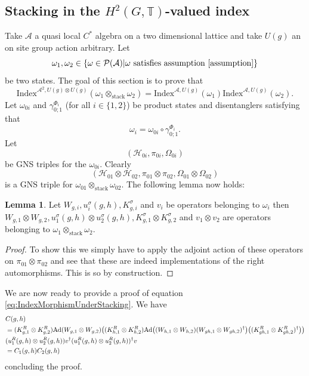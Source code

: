 \documentclass[12pt,a4paper,twoside]{article}
\let\originalleft\left
\let\originalright\right
\renewcommand{\left}{\mathopen{}\mathclose\bgroup\originalleft}
\renewcommand{\right}{\aftergroup\egroup\originalright}
\newcommand{\PP}{\mathcal P}
\newcommand{\HH}{\mathcal H}
\newcommand{\TT}{\mathbb T}
\renewcommand{\AA}{\mathcal A}
\newcommand{\Ad}[1]{\textrm{Ad}\left(#1\right)}
\theoremstyle{definition}
\newtheorem{lemma}[theorem]{Lemma}
\numberwithin{equation}{section}
\begin{document}
\subsection{Stacking in the $H^2(G,\TT)$-valued index}\label{sec:StackingOneTranslation}
Take $\AA$ a quasi local $C^*$ algebra on a two dimensional lattice and take $U(g)$ an on site group action arbitrary. Let
\begin{equation}
	\omega_1,\omega_2\in\{\omega\in\PP(\AA)|\omega\text{ satisfies assumption \ref{assumption}}\}
\end{equation}
be two states. The goal of this section is to prove that
\begin{equation}\label{eq:IndexMorphismUnderStacking}
	\textrm{Index}^{\AA^2,U(g)\otimes U(g)}(\omega_1\otimes_{\text{stack}}\omega_2)=\textrm{Index}^{\AA,U(g)}(\omega_1)\textrm{Index}^{\AA,U(g)}(\omega_2).
\end{equation}
Let $\omega_{0i}$ and $\gamma_{0;1}^{\Phi_i}$ (for all $i\in\{1,2\}$) be product states and disentanglers satisfying that
\begin{equation}
	\omega_i=\omega_{0i}\circ\gamma_{0;1}^{\Phi_i}.
\end{equation}
Let
\begin{equation}
	(\HH_{0i},\pi_{0i},\Omega_{0i})
\end{equation}
be GNS triples for the $\omega_{0i}$. Clearly
\begin{equation}
	(\HH_{01}\otimes\HH_{02},\pi_{01}\otimes\pi_{02},\Omega_{01}\otimes\Omega_{02})
\end{equation}
is a GNS triple for $\omega_{01}\otimes_{\text{stack}}\omega_{02}$. The following lemma now holds:
\begin{lemma}
	Let $W_{g,i},u^\sigma_i(g,h),K_{g,i}^\sigma$ and $v_{i}$ be operators belonging to $\omega_i$ then $W_{g,1}\otimes W_{g,2},u^\sigma_1(g,h)\otimes u^\sigma_2(g,h),K_{g,1}^\sigma\otimes K_{g,2}^\sigma$ and $v_{1}\otimes v_{2}$ are operators belonging to $\omega_1\otimes_{\text{stack}}\omega_2$.
\end{lemma}
\begin{proof}
	To show this we simply have to apply the adjoint action of these operators on $\pi_{01}\otimes\pi_{02}$ and see that these are indeed implementations of the right automorphisms. This is so by construction.
\end{proof}
We are now ready to provide a proof of equation \ref{eq:IndexMorphismUnderStacking}. We have
\begin{align}
	&C(g,h)\\
	\nonumber
	&=(K_{g,1}^R\otimes K_{g,2}^R)\Ad{W_{g,1}\otimes W_{g,2}}\left((K_{h,1}^R\otimes K_{h,2}^R)\Ad{(W_{h,1}\otimes W_{h,2})(W_{gh,1}\otimes W_{gh,2})^\dagger}\left((K_{gh,1}^R\otimes K_{gh,2}^R)^\dagger\right)\right)\\
	&(u^R_1(g,h)\otimes u^R_2(g,h))v^\dagger (u^R_1(g,h)\otimes u^R_2(g,h))^\dagger v\\
	&=C_1(g,h)C_2(g,h)
\end{align}
concluding the proof.
\end{document}
